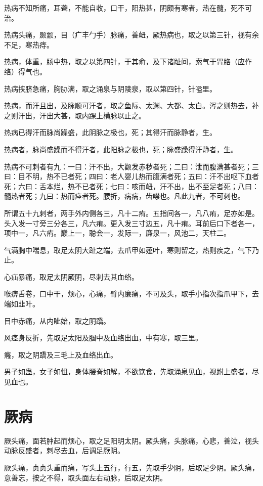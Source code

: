 \documentclass[12pt,UTF8]{ctexbook}
\begin{document}
	热病不知所痛，耳聋，不能自收，口干，阳热甚，阴颇有寒者，热在髓，死不可治。
	
	热病头痛，颞颥，目（疒丰勹手）脉痛，善衄，厥热病也，取之以第三针，视有余不足，寒热痔。
	
	热病，体重，肠中热，取之以第四针，于其俞，及下诸趾间，索气于胃胳（应作络）得气也。
	
	热病挟脐急痛，胸胁满，取之涌泉与阴陵泉，取以第四针，针嗌里。
	
	热病，而汗且出，及脉顺可汗者，取之鱼际、太渊、大都、太白。泻之则热去，补之则汗出，汗出大甚，取内踝上横脉以止之。
	
	热病已得汗而脉尚躁盛，此阴脉之极也，死；其得汗而脉静者，生。
	
	热病者，脉尚盛躁而不得汗者，此阳脉之极也，死；脉盛躁得汗静者，生。
	
	热病不可刺者有九：一曰：汗不出，大颧发赤秽者死；二曰：泄而腹满甚者死；三曰：目不明，热不已者死；四曰：老人婴儿热而腹满者死；五曰：汗不出呕下血者死；六曰：舌本烂，热不已者死；七曰：咳而衄，汗不出，出不至足者死；八曰：髓热者死；九曰：热而痉者死。腰折，病病，齿噤也。凡此九者，不可刺也。
	
	所谓五十九刺者，两手外内侧各三，凡十二痏。五指间各一，凡八痏，足亦如是。头入发一寸旁三分各三，凡六痏。更入发三寸边五，凡十痏。耳前后口下者各一，项中一，凡六痏。巅上一，聪会一，发际一，廉泉一，风池二，天柱二。
	
	气满胸中喘息，取足太阴大趾之端，去爪甲如薤叶，寒则留之，热则疾之，气下乃止。
	
	心疝暴痛，取足太阴厥阴，尽刺去其血络。
	
	喉痹舌卷，口中干，烦心，心痛，臂内廉痛，不可及头，取手小指次指爪甲下，去端如韭叶。
	
	目中赤痛，从内眦始，取之阴蹻。
	
	风痉身反折，先取足太阳及腘中及血络出血，中有寒，取三里。
	
	癃，取之阴蹻及三毛上及血络出血。
	
	男子如蛊，女子如怚，身体腰脊如解，不欲饮食，先取涌泉见血，视跗上盛者，尽见血也。
	\chapter{厥病}
	
	厥头痛，面若肿起而烦心，取之足阳明太阴。厥头痛，头脉痛，心悲，善泣，视头动脉反盛者，刺尽去血，后调足厥阴。
	
	厥头痛，贞贞头重而痛，写头上五行，行五，先取手少阴，后取足少阴。厥头痛，意善忘，按之不得，取头面左右动脉，后取足太阴。
	
\end{document}
